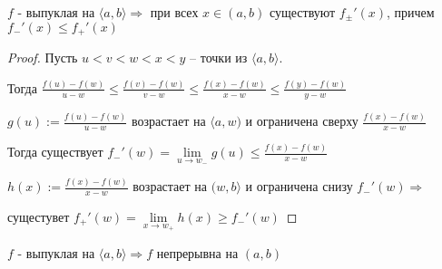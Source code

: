 \begin{theorem-non}
    $f$ - выпуклая на $\langle a, b \rangle \Longrightarrow$ при всех $x \in (a, b)$
    существуют $f_{\pm}'(x)$, причем $f_{-}'(x) \leqslant f_{+}'(x)$

    \begin{proof}
        Пусть $u < v < w < x < y$ -- точки из $\langle a, b \rangle$. 
        
        Тогда $\frac{f(u) - f(w)}{u - w} \leqslant \frac{f(v) - f(w)}{v - w} \leqslant \frac{f(x) - f(w)}{x - w} \leqslant \frac{f(y) - f(w)}{y - w}$

        $g(u) := \frac{f(u) - f(w)}{u - w}$ возрастает на $\langle a, w)$ и ограничена сверху 
        $\frac{f(x) - f(w)}{x - w}$

        Тогда существует $f_{-}'(w) = \lim\limits_{u \longrightarrow w_{-}}{g(u)} \leqslant \frac{f(x) - f(w)}{x - w}$

        $h(x) := \frac{f(x) - f(w)}{x - w}$ возрастает на $( w, b \rangle$ и ограничена снизу 
        $f_{-}'(w) \Longrightarrow$ 
        
        сущестувет $f_{+}'(w) = \lim\limits_{x \longrightarrow w_{+}}{h(x)} \geqslant f_{-}'(w) $
    \end{proof}
\end{theorem-non}

\follow \; $f$ - выпуклая на $\langle a, b \rangle \Longrightarrow f$ непрерывна на $(a, b)$  
